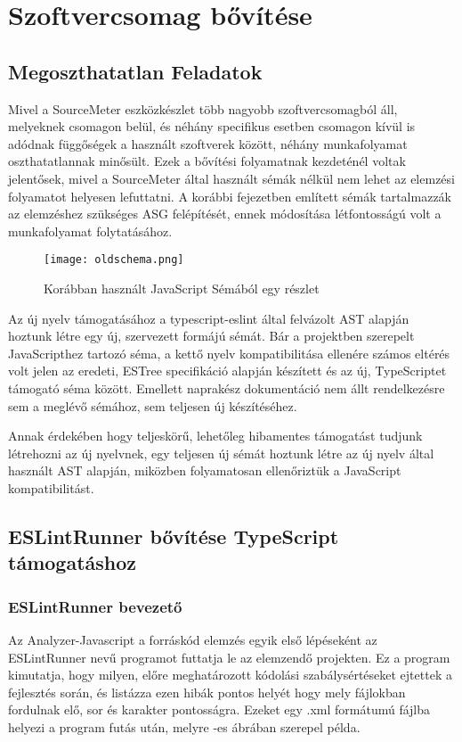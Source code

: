 \chapter{Szoftvercsomag bővítése}
\label{chap:fejezet4}

\section{Megoszthatatlan Feladatok}

Mivel a SourceMeter eszközkészlet több nagyobb szoftvercsomagból áll, melyeknek csomagon belül, és néhány specifikus esetben csomagon kívül is adódnak függőségek a használt szoftverek között, néhány munkafolyamat oszthatatlannak minősült. Ezek a bővítési folyamatnak kezdeténél voltak jelentősek, mivel a SourceMeter által használt sémák nélkül nem lehet az elemzési folyamatot helyesen lefuttatni. A korábbi fejezetben említett sémák tartalmazzák az elemzéshez szükséges ASG felépítését, ennek módosítása létfontosságú volt a munkafolyamat folytatásához.

\begin{figure}[!htbp]
    \caption{Korábban használt JavaScript Sémából egy részlet}\label{fig:apocalypse}
    \centering
    \texttt{[image: oldschema.png]}
\end{figure}

Az új nyelv támogatásához a typescript-eslint által felvázolt AST \cite{typescript-eslint-ast} alapján hoztunk létre egy új, szervezett formájú sémát. Bár a projektben szerepelt JavaScripthez tartozó séma, a kettő nyelv kompatibilitása ellenére számos eltérés volt jelen az eredeti, ESTree specifikáció \cite{estree-spec} alapján készített és az új, TypeScriptet támogató séma között. Emellett naprakész dokumentáció nem állt rendelkezésre sem a meglévő sémához, sem teljesen új készítéséhez.

Annak érdekében hogy teljeskörű, lehetőleg hibamentes támogatást tudjunk létrehozni az új nyelvnek, egy teljesen új sémát hoztunk létre az új nyelv által használt AST alapján, miközben folyamatosan ellenőriztük a JavaScript kompatibilitást. 

\section{ESLintRunner bővítése TypeScript támogatáshoz}

\subsection{ESLintRunner bevezető}
Az Analyzer-Javascript a forráskód elemzés egyik első lépéseként az ESLintRunner nevű programot futtatja le az elemzendő projekten. Ez a program kimutatja, hogy milyen, előre meghatározott kódolási szabálysértéseket ejtettek a fejlesztés során, és listázza ezen hibák pontos helyét hogy mely fájlokban fordulnak elő, sor és karakter pontosságra. Ezeket egy .xml formátumú fájlba helyezi a program futás után, melyre -es ábrában szerepel példa.

